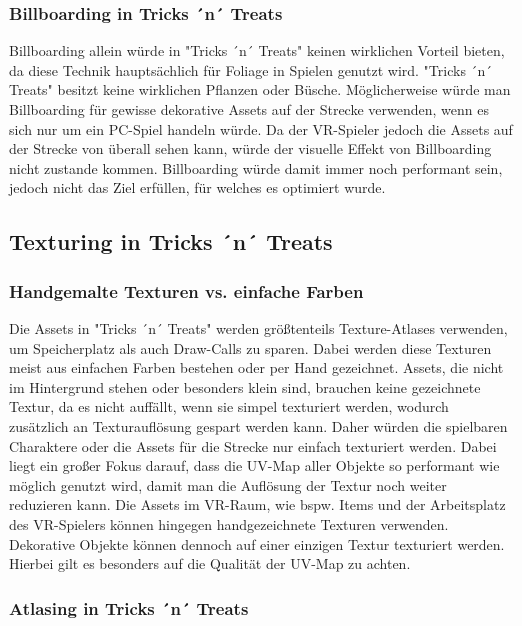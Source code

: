 \subsubsection{Billboarding in Tricks ´n´ Treats}
Billboarding allein würde in "Tricks ´n´ Treats" keinen wirklichen Vorteil bieten, da diese Technik hauptsächlich für Foliage in Spielen genutzt wird. "Tricks ´n´ Treats" besitzt keine wirklichen Pflanzen oder Büsche. Möglicherweise würde man Billboarding für gewisse dekorative Assets auf der Strecke verwenden, wenn es sich nur um ein PC-Spiel handeln würde. Da der VR-Spieler jedoch die Assets auf der Strecke von überall sehen kann, würde der visuelle Effekt von Billboarding nicht zustande kommen. Billboarding würde damit immer noch performant sein, jedoch nicht das Ziel erfüllen, für welches es optimiert wurde.

\subsection{Texturing in Tricks ´n´ Treats}

\subsubsection{Handgemalte Texturen vs. einfache Farben}

Die Assets in "Tricks ´n´ Treats" werden größtenteils Texture-Atlases verwenden, um Speicherplatz als auch Draw-Calls zu sparen. Dabei werden diese Texturen meist aus einfachen Farben bestehen oder per Hand gezeichnet. Assets, die nicht im Hintergrund stehen oder besonders klein sind, brauchen keine gezeichnete Textur, da es nicht auffällt, wenn sie simpel texturiert werden, wodurch zusätzlich an Texturauflösung gespart werden kann. Daher würden die spielbaren Charaktere oder die Assets für die Strecke nur einfach texturiert werden. Dabei liegt ein großer Fokus darauf, dass die UV-Map aller Objekte so performant wie möglich genutzt wird, damit man die Auflösung der Textur noch weiter reduzieren kann.
Die Assets im VR-Raum, wie bspw. Items und der Arbeitsplatz des VR-Spielers können hingegen handgezeichnete Texturen verwenden. Dekorative Objekte können dennoch auf einer einzigen Textur texturiert werden. Hierbei gilt es besonders auf die Qualität der UV-Map zu achten.

\subsubsection{Atlasing in Tricks ´n´ Treats}

